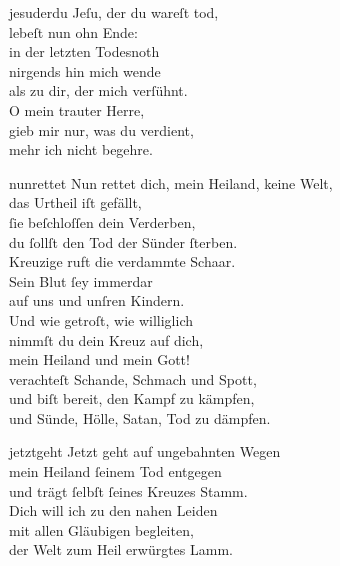 \documentclass[tocstyle=ref-genre]{ees}
\begin{document}
{  \begin{movement}{jesuderdu}
    \voice[Coro]
    Jeſu, der du wareſt tod,\\
    lebeſt nun ohn Ende:\\
    in der letzten Todesnoth\\
    nirgends hin mich wende\\
    als zu dir, der mich verſühnt.\\
    O mein trauter Herre,\\
    gieb mir nur, was du verdient,\\
    mehr ich nicht begehre.
  \end{movement}

  \begin{movement}{nunrettet}
    \voice[Alto]
    Nun rettet dich, mein Heiland, keine Welt,\\
    das Urtheil iſt gefällt,\\
    ſie beſchloſſen dein Verderben,\\
    du ſollſt den Tod der Sünder ſterben.\\
    Kreuzige ruft die verdammte Schaar.\\
    Sein Blut ſey immerdar\\
    auf uns und unſren Kindern.\\
    Und wie getroſt, wie williglich\\
    nimmſt du dein Kreuz auf dich,\\
    mein Heiland und mein Gott!\\
    verachteſt Schande, Schmach und Spott,\\
    und biſt bereit, den Kampf zu kämpfen,\\
    und Sünde, Hölle, Satan, Tod zu dämpfen.
  \end{movement}

  \begin{movement}{jetztgeht}
    \voice[Alto]
    Jetzt geht auf ungebahnten Wegen\\
    mein Heiland ſeinem Tod entgegen\\
    und trägt ſelbſt ſeines Kreuzes Stamm.\\[1ex]
    Dich will ich zu den nahen Leiden\\
    mit allen Gläubigen begleiten,\\
    der Welt zum Heil erwürgtes Lamm.
  \end{movement}

  \begin{movement}{}
    \voice[]
  \end{movement}

  \begin{movement}{}
    \voice[]
  \end{movement}

  \begin{movement}{}
    \voice[]
  \end{movement}

  \begin{movement}{}
    \voice[]
  \end{movement}
}

\eesScore
\end{document}
